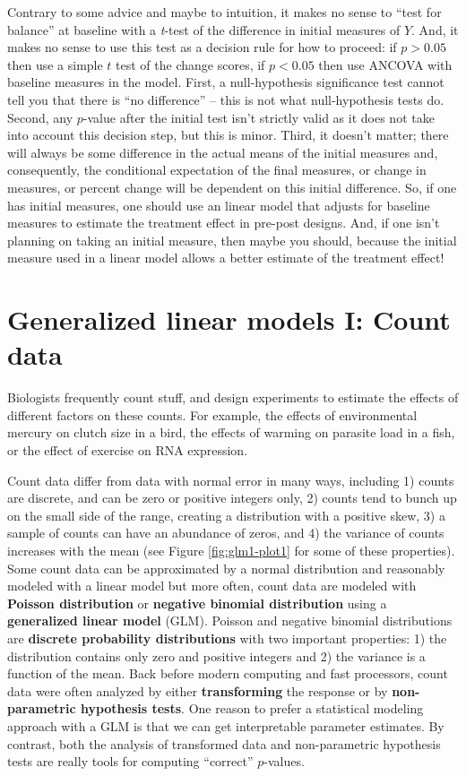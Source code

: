 \documentclass[]{book}
\begin{document}
Contrary to some advice and maybe to intuition, it makes no sense to
``test for balance'' at baseline with a \emph{t}-test of the difference
in initial measures of \(Y\). And, it makes no sense to use this test as
a decision rule for how to proceed: if \(p>0.05\) then use a simple
\(t\) test of the change scores, if \(p<0.05\) then use ANCOVA with
baseline measures in the model. First, a null-hypothesis significance
test cannot tell you that there is ``no difference'' -- this is not what
null-hypothesis tests do. Second, any \(p\)-value after the initial test
isn't strictly valid as it does not take into account this decision
step, but this is minor. Third, it doesn't matter; there will always be
some difference in the actual means of the initial measures and,
consequently, the conditional expectation of the final measures, or
change in measures, or percent change will be dependent on this initial
difference. So, if one has initial measures, one should use an linear
model that adjusts for baseline measures to estimate the treatment
effect in pre-post designs. And, if one isn't planning on taking an
initial measure, then maybe you should, because the initial measure used
in a linear model allows a better estimate of the treatment effect!

\chapter{Generalized linear models I: Count
data}\label{generalized-linear-models-i-count-data}

Biologists frequently count stuff, and design experiments to estimate
the effects of different factors on these counts. For example, the
effects of environmental mercury on clutch size in a bird, the effects
of warming on parasite load in a fish, or the effect of exercise on RNA
expression.

Count data differ from data with normal error in many ways, including 1)
counts are discrete, and can be zero or positive integers only, 2)
counts tend to bunch up on the small side of the range, creating a
distribution with a positive skew, 3) a sample of counts can have an
abundance of zeros, and 4) the variance of counts increases with the
mean (see Figure \ref{fig:glm1-plot1} for some of these properties).
Some count data can be approximated by a normal distribution and
reasonably modeled with a linear model but more often, count data are
modeled with \textbf{Poisson distribution} or \textbf{negative binomial
distribution} using a \textbf{generalized linear model} (GLM). Poisson
and negative binomial distributions are \textbf{discrete probability
distributions} with two important properties: 1) the distribution
contains only zero and positive integers and 2) the variance is a
function of the mean. Back before modern computing and fast processors,
count data were often analyzed by either \textbf{transforming} the
response or by \textbf{non-parametric hypothesis tests}. One reason to
prefer a statistical modeling approach with a GLM is that we can get
interpretable parameter estimates. By contrast, both the analysis of
transformed data and non-parametric hypothesis tests are really tools
for computing ``correct'' \(p\)-values.
\end{document}
